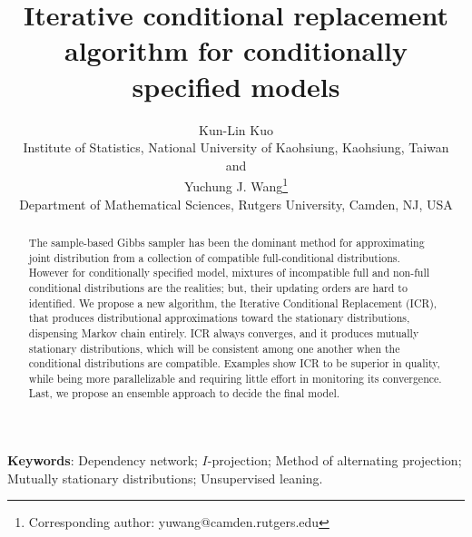 \documentclass[12pt,a4paper]{article}
\begin{document}
\title{\bf Iterative conditional replacement algorithm for conditionally specified models}
\author{Kun-Lin Kuo\\
    Institute of Statistics, National University of Kaohsiung, Kaohsiung, Taiwan\\
    and \\
    Yuchung J. Wang\thanks{Corresponding author: yuwang@camden.rutgers.edu}\\
    Department of Mathematical Sciences, Rutgers University, Camden, NJ, USA}
\date{}
\maketitle

\begin{abstract}

The sample-based Gibbs sampler has been the dominant method for approximating joint distribution from a collection of compatible full-conditional distributions.  However for conditionally specified model, mixtures of incompatible full and non-full conditional distributions are the realities; but, their updating orders are hard to identified. We propose a new algorithm, the Iterative Conditional Replacement (ICR), that produces distributional approximations toward the stationary distributions, dispensing Markov chain entirely.   ICR always converges, and it produces mutually stationary distributions, which will be consistent among one another when the conditional distributions are compatible. Examples show ICR to be superior in quality, while being more parallelizable and requiring little effort in monitoring its convergence.
Last, we propose an ensemble approach to decide the final model.
\end{abstract}

\noindent%
{\bf Keywords}: Dependency network; $I$-projection;
Method of alternating projection;  Mutually stationary distributions; Unsupervised leaning.
\vfill
\end{document}
